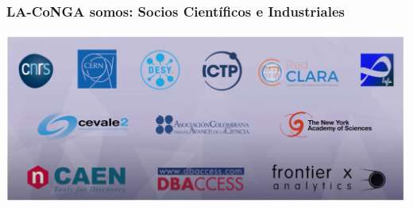 
\begin{frame}[fragile]
\frametitle{LA-CoNGA somos: Socios Científicos e Industriales}

\begin{center}
\includegraphics[scale=0.5]{imagenes/sociosCienInd.png}
\end{center}

\end{frame}



